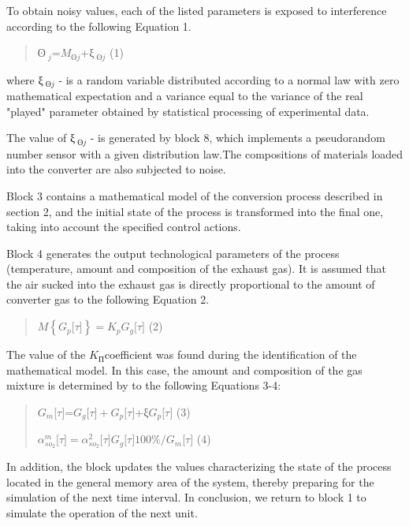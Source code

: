 To obtain noisy values, each of the listed parameters is exposed to
interference according to the following Equation 1.

\begin{quote}
ʘ\(\ _{j}\)=\(M_{ʘj}\)+ξ\(\ _{ʘj}\) (1)
\end{quote}

where ξ\(\ _{ʘj}\) - is a random variable distributed according to a
normal law with zero mathematical expectation and a variance equal to
the variance of the real "played" parameter obtained by statistical
processing of experimental data.

The value of ξ\(\ _{ʘj}\) - is generated by block 8, which implements a
pseudorandom number sensor with a given distribution law.The
compositions of materials loaded into the converter are also subjected
to noise.

Block 3 contains a mathematical model of the conversion process
described in section 2, and the initial state of the process is
transformed into the final one, taking into account the specified
control actions.

Block 4 generates the output technological parameters of the process
(temperature, amount and composition of the exhaust gas). It is assumed
that the air sucked into the exhaust gas is directly proportional to the
amount of converter gas to the following Equation 2.

\begin{quote}
\(M\left\{ G_{p}\lbrack\tau\rbrack \right\} = K_{p}G_{g}\lbrack\tau\rbrack\)
(2)
\end{quote}

The value of the \(K_{П}\)coefficient was found during the
identification of the mathematical model. In this case, the amount and
composition of the gas mixture is determined by to the following
Equations 3-4:

\begin{quote}
\(G_{m}\lbrack\tau\rbrack\)=\(G_{g}\lbrack\tau\rbrack + G_{p}\lbrack\tau\rbrack\)+ξ\(G_{p}\lbrack\tau\rbrack\)
(3)

\(\alpha_{{so}_{2}}^{m}\lbrack\tau\rbrack = \alpha_{{so}_{2}}^{2}\lbrack\tau\rbrack G_{g}\lbrack\tau\rbrack 100\%/G_{m}\lbrack\tau\rbrack\)
(4)
\end{quote}

In addition, the block updates the values characterizing the state of
the process located in the general memory area of the system, thereby
preparing for the simulation of the next time interval. In conclusion,
we return to block 1 to simulate the operation of the next unit.

